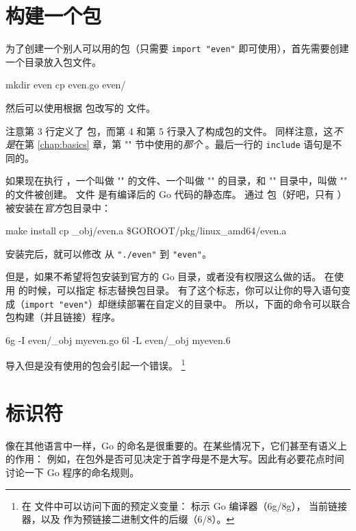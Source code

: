 \section{构建一个包}
\label{sec:building a package}
为了创建一个别人可以用的包（只需要 \lstinline{import "even"} 即可使用），首先需要创建一个目录放入包文件。
\begin{display}
\pr mkdir even
\pr cp even.go even/
\end{display}
\noindent{}然后可以使用根据  包改写的  文件。

注意第 3 行定义了  包，而第 4 和第 5 行录入了构成包的文件。
同样注意，这\emph{不是}在第 \ref{chap:basics} 章，第 ""
节中使用的\emph{那个} 。最后一行的 \verb|include| 语句是不同的。

如果现在执行 ，一个叫做 "" 的文件、一个叫做
"" 的目录，和 "" 目录中，叫做 "" 的文件被创建。
文件  是有编译后的 Go 代码的静态库。
通过  包（好吧，只有 ）被安装在\emph{官方}包目录中：
\begin{display}
\pr make install
cp \_obj/even.a \$GOROOT/pkg/linux\_amd64/even.a
\end{display}
\noindent{}安装完后，就可以修改  从
\lstinline{"./even"} 到 \lstinline{"even"}。

但是，如果不希望将包安装到官方的 Go 目录，或者没有权限这么做的话。
在使用  的时候，可以指定  标志替换包目录。
有了这个标志，你可以让你的导入语句变成（\lstinline{import "even"}）却继续部署在自定义的目录中。
所以，下面的命令可以联合包构建（并且链接）程序。
\begin{display}
\pr 6g -I even/\_obj myeven.go	
\pr 6l -L even/\_obj myeven.6	
\end{display}

\noindent{}导入但是没有使用的包会引起一个错误。
\footnote{在  文件中可以访问下面的预定义变量：
 标示 Go 编译器（6g/8g），
 当前链接器，以及  作为预链接二进制文件的后缀（6/8）。}

\section{标识符}
像在其他语言中一样，Go 的命名是很重要的。在某些情况下，它们甚至有语义上的作用：
例如，在包外是否可见决定于首字母是不是大写。因此有必要花点时间讨论一下 Go 程序的命名规则。

